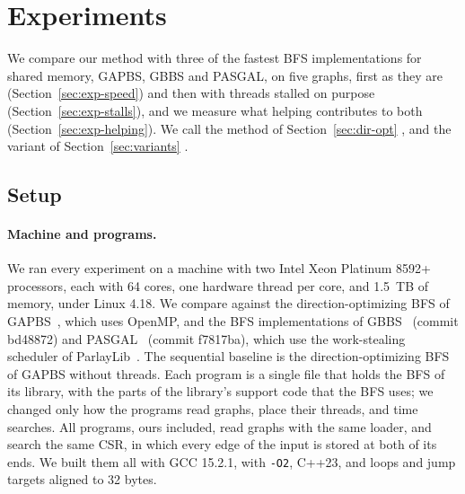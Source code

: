 \section{Experiments}
\label{sec:experiments}

We compare our method with three of the fastest BFS implementations for shared memory, GAPBS, GBBS and PASGAL, on five graphs, first as they are (Section~\ref{sec:exp-speed}) and then with threads stalled on purpose (Section~\ref{sec:exp-stalls}), and we measure what helping contributes to both (Section~\ref{sec:exp-helping}). We call the method of Section~\ref{sec:dir-opt} \wfdo, and the variant of Section~\ref{sec:variants} \wfdomem.

\subsection{Setup}
\label{sec:exp-setup}

\paragraph{Machine and programs.} We ran every experiment on a machine with two Intel Xeon Platinum 8592+ processors, each with 64 cores, one hardware thread per core, and 1.5~TB of memory, under Linux 4.18. We compare against the direction-optimizing BFS of GAPBS~\cite{gapbs}, which uses OpenMP, and the BFS implementations of GBBS~\cite{gbbs} (commit bd48872) and PASGAL~\cite{pasgal} (commit f7817ba), which use the work-stealing scheduler of ParlayLib~\cite{parlaylib}. The sequential baseline is the direction-optimizing BFS of GAPBS without threads. Each program is a single file that holds the BFS of its library, with the parts of the library's support code that the BFS uses; we changed only how the programs read graphs, place their threads, and time searches. All programs, ours included, read graphs with the same loader, and search the same CSR, in which every edge of the input is stored at both of its ends. We built them all with GCC 15.2.1, with \texttt{-O2}, C++23, and loops and jump targets aligned to 32 bytes.

